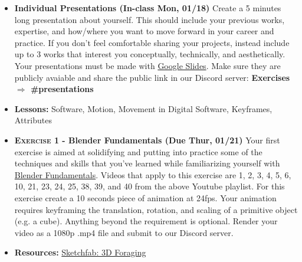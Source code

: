 \def\dMon{Mon, 01/18}
\def\dTues{Tues, 01/19}
\def\dWed{Wed, 01/20}
\def\dThur{Thur, 01/21}
\def\dFri{Fri, 01/22}
\def\dSat{Sat, 01/23}
\def\dSun{Sun, 01/24}
\placeDate





% 
\begin{itemize}[noitemsep,topsep=0pt,leftmargin=*]
    \item \textbf{Individual Presentations (In-class \dMon)} Create a 5 minutes long presentation about yourself. This should include your previous works, expertise, and how/where you want to move forward in your career and practice. If you don't feel comfortable sharing your projects, instead include up to 3 works that interest you conceptually, technically, and aesthetically. Your presentations must be made with \href{https://docs.google.com/presentation/}{Google Slides}. Make sure they are publicly avaiable and share the public link in our Discord server: \textbf{Exercises $\Rightarrow$ \#presentations}
\end{itemize}
\vspace{1em}
\begin{itemize}[noitemsep,topsep=0pt,leftmargin=*]
    \item \textbf{Lessons:} Software, Motion, Movement in Digital Software, Keyframes, Attributes
    \item \textbf{\textsc{Exercise 1} - Blender Fundamentals (Due \dThur)} Your first exercise is aimed at solidifying and putting into practice some of the techniques and skills that you've learned while familiarizing yourself with \href{https://www.youtube.com/playlist?list=PLa1F2ddGya_-UvuAqHAksYnB0qL9yWDO6}{Blender Fundamentals}. Videos that apply to this exercise are 1, 2, 3, 4, 5, 6, 10, 21, 23, 24, 25, 38, 39, and 40 from the above Youtube playlist. For this exercise create a 10 seconds piece of animation at 24fps. Your animation requires keyframing the translation, rotation, and scaling of a primitive object (e.g. a cube). Anything beyond the requirement is optional. Render your video as a 1080p .mp4 file and submit to our Discord server.
    \item \textbf{Resources:} \href{https://sketchfab.com/search?features\=downloadable\&q\=scan+heritage\&sort\_by\=-relevance\&type\=models}{Sketchfab: 3D Foraging}
\end{itemize}